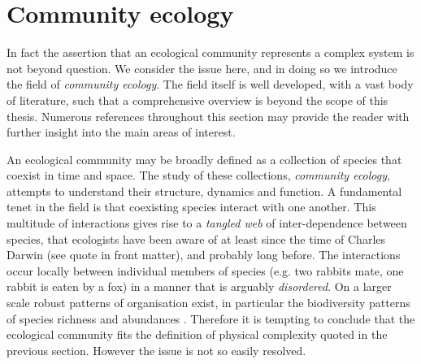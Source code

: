   
\section{Community ecology}
\label{sec:intro_community_ecology}

In fact the assertion that an ecological community represents a complex system is not beyond question. We consider the issue here, and in doing so we introduce the field of \emph{community ecology}. The field itself is well developed, with a vast body of literature, such that a comprehensive overview is beyond the scope of this thesis. Numerous references throughout this section may provide the reader with further insight into the main areas of interest.   

An ecological community may be broadly defined as a collection of species that coexist in time and space. The study of these collections, \emph{community ecology}, attempts to understand their structure, dynamics and function. A fundamental tenet in the field is that coexisting species interact with one another. This multitude of interactions gives rise to a \emph{tangled web} of inter-dependence between species, that ecologists have been aware of at least since the time of Charles Darwin \cite{darwin2009origin} (see quote in front matter), and probably long before. The interactions occur locally between individual members of species (e.g. two rabbits mate, one rabbit is eaten by a fox) in a manner that is arguably \emph{disordered}. On a larger scale robust patterns of organisation exist, in particular the biodiversity patterns of species richness and abundances \cite{sanderson2015patterns, purves2005ecological}. Therefore it is tempting to conclude that the ecological community fits the definition of physical complexity quoted in the previous section. However the issue is not so easily resolved.


